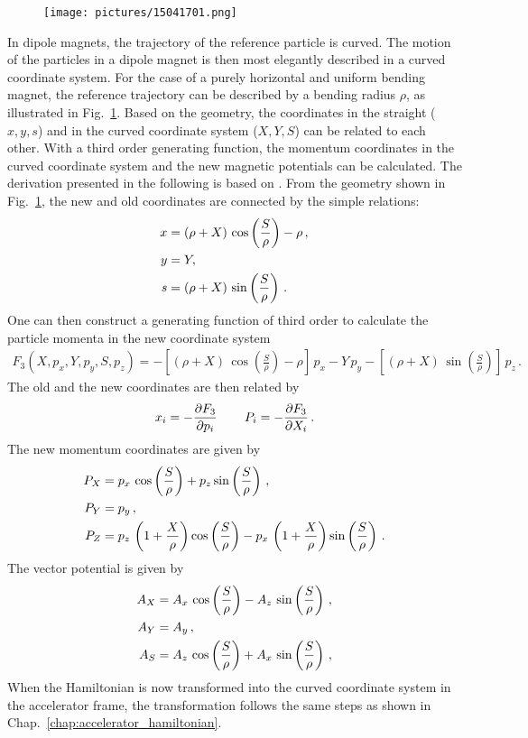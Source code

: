 \begin{appendix}
%
  \begin{figure}[t]
  \centering
  \texttt{[image: pictures/15041701.png]}
  \caption{}  
  \label{pic:15041701}
  \end{figure}
%
In dipole magnets, the trajectory of the reference particle is curved. The motion of the particles in a dipole magnet is then most elegantly described in a curved coordinate system. For the case of a purely horizontal and uniform bending magnet, the reference trajectory can be described by a bending radius $\rho$, as illustrated in Fig.~\ref{pic:15041701}. Based on the geometry, the coordinates in the straight ($x,y,s$) and in the curved coordinate system ($X,Y,S$) can be related to each other. With a third order generating function, the momentum coordinates in the curved coordinate system and the new magnetic potentials can be calculated. The derivation presented in the following is based on \cite{wolski2014beam}. From the geometry shown in Fig.~\ref{pic:15041701}, the new and old coordinates are connected by the simple relations:
\begin{align}
x &= (\rho + X) \, \cos \left( \frac{S}{\rho} \right) - \rho \, , \notag \\
y &= Y , \\
s &= (\rho + X) \, \sin \left( \frac{S}{\rho} \right)  \notag \, .
\end{align}
One can then construct a generating function of third order to calculate the particle momenta in the new coordinate system~\cite{}
\begin{align}
F_3 (X,p_x,Y,p_y,S,p_z) = - \left[ (\rho + X) \, \cos \left( \frac{S}{\rho} \right) - \rho \right] \, p_x - Y \, p_y  - \left[ (\rho + X) \, \sin \left( \frac{S}{\rho} \right) \right] \, p_z \, .
\end{align}
%
The old and the new coordinates are then related by 
\begin{align}
x_i = - \frac{\partial F_3}{\partial p_i} \, \quad \quad P_i = - \frac{\partial F_3}{\partial X_i} \, .
\end{align}
The new momentum coordinates are given by
\begin{align}
P_X &= p_x \,  \cos \left( \frac{S}{\rho} \right) + p_z  \sin \left( \frac{S}{\rho} \right) \, , \notag \\
P_Y &= p_y \, , \\
P_Z &= p_z \, \left( 1 + \frac{X}{\rho} \right)  \cos \left( \frac{S}{\rho} \right) - p_x \, \left( 1 + \frac{X}{\rho} \right)  \sin \left( \frac{S}{\rho} \right) \, . \notag
\end{align}
%
The vector potential is given by
\begin{align}
A_X &= A_x \, \cos \left( \frac{S}{\rho} \right) - A_z \, \sin \left( \frac{S}{\rho} \right) \, , \notag \\
A_Y &= A_y \, , \\ 
A_S &= A_z \, \cos \left( \frac{S}{\rho} \right) + A_x \, \sin \left( \frac{S}{\rho} \right) \, , \notag 
\end{align}
When the Hamiltonian is now transformed into the curved coordinate system in the accelerator frame, the transformation follows the same steps as shown in Chap.~\ref{chap:accelerator_hamiltonian}. 


\end{appendix}
